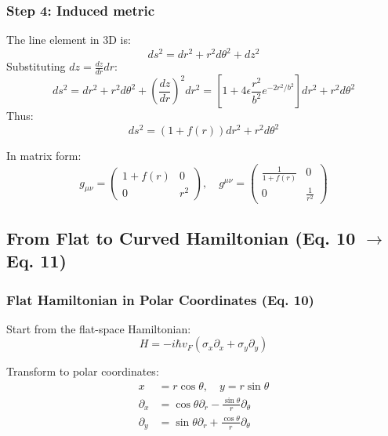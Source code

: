 \documentclass[12pt]{article}
\begin{document}
\subsubsection{Step 4: Induced metric}
The line element in 3D is:
\begin{equation}
    ds^2 = dr^2 + r^2 d\theta^2 + dz^2
\end{equation}
Substituting $dz = \frac{dz}{dr} dr$:
\begin{equation}
    ds^2 = dr^2 + r^2 d\theta^2 + \left(\frac{dz}{dr}\right)^2 dr^2
    = \left[1 + 4\epsilon \frac{r^2}{b^2} e^{-2r^2/b^2}\right] dr^2 + r^2 d\theta^2
\end{equation}
Thus:
\begin{equation}
    ds^2 = (1+f(r)) dr^2 + r^2 d\theta^2
\end{equation}

In matrix form:
\begin{equation}
    g_{\mu\nu} = \begin{pmatrix}
    1 + f(r) & 0 \\
    0 & r^2
    \end{pmatrix}, \quad
    g^{\mu\nu} = \begin{pmatrix}
    \frac{1}{1+f(r)} & 0 \\
    0 & \frac{1}{r^2}
    \end{pmatrix}
\end{equation}

\subsection{From Flat to Curved Hamiltonian (Eq. 10 $\to$ Eq. 11)}

\subsubsection{Flat Hamiltonian in Polar Coordinates (Eq. 10)}

Start from the flat-space Hamiltonian:
\begin{equation}
    H = -i\hbar v_F (\sigma_x \partial_x + \sigma_y \partial_y)
\end{equation}

Transform to polar coordinates:
\begin{align}
    x &= r\cos\theta, \quad y = r\sin\theta \\
    \partial_x &= \cos\theta \partial_r - \frac{\sin\theta}{r} \partial_\theta \\
    \partial_y &= \sin\theta \partial_r + \frac{\cos\theta}{r} \partial_\theta
\end{align}
\end{document}
